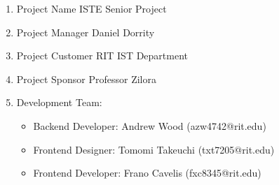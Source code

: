\begin{enumerate}
	\item Project Name \hfill ISTE Senior Project
	\item Project Manager \hfill Daniel Dorrity
	\item Project Customer \hfill RIT IST Department
	\item Project Sponsor \hfill Professor Zilora
	\item Development Team:
		\begin{itemize}
			\item Backend Developer: \hfill Andrew Wood (azw4742@rit.edu)
			\item Frontend Designer: \hfill Tomomi Takeuchi (txt7205@rit.edu)
			\item Frontend Developer: \hfill Frano Cavelis (fxc8345@rit.edu)
		\end{itemize}
\end{enumerate}
